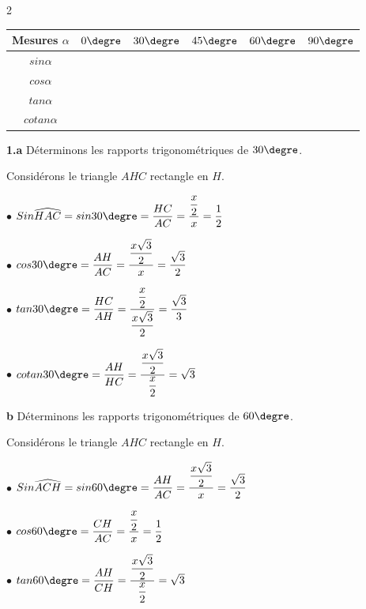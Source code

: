\begin{multicols*}{2}
\begin{enumerate}
  		\begin{tabular}{|c|c|c|c|c|c|}
  			\hline
  			Mesures $\alpha$	&$0\textrm{\degre}$  &$30\textrm{\degre}$  & $45\textrm{\degre}$ &$60\textrm{\degre}$  & $90\textrm{\degre}$ \\
  			\hline
  			$sin\alpha$	&  &  &  &  &  \\
  			\hline
  			$cos\alpha$	&  &  &  &  &  \\
  			\hline
  			$tan\alpha$	&  &  &  &  &   \\
  			\hline
  			$cotan\alpha$	&   &  &  &  &  \\
  			\hline
  		\end{tabular}
  	\end{enumerate}
  	\dure 
  	\resul
  	
  	\textbf{1.a} Déterminons les rapports trigonométriques de $30\textrm{\degre}$.
  	
  	Considérons le triangle $AHC$ rectangle en $H$.\vspace{0.3cm}
  	
  	$\bullet$ $Sin\widehat{HAC}=sin30\textrm{\degre}=\dfrac{HC}{AC}=\dfrac{\dfrac{x}{2}}{x}=\dfrac{1}{2}$\vspace{0.3cm}
  	
  	$\bullet$ $cos30\textrm{\degre}=\dfrac{AH}{AC}=\dfrac{\dfrac{x\sqrt{3}}{2}}{x}=\dfrac{\sqrt{3}}{2}$\vspace{0.3cm}
  	
  	$\bullet$ $tan30\textrm{\degre}=\dfrac{HC}{AH}=\dfrac{\dfrac{x}{2}}{\dfrac{x\sqrt{3}}{2}}=\dfrac{\sqrt{3}}{3}$ \vspace{0.3cm}
  	
  	$\bullet$ $cotan30\textrm{\degre}=\dfrac{AH}{HC}=\dfrac{\dfrac{x\sqrt{3}}{2}}{\dfrac{x}{2}}=\sqrt{3}$ \vspace{0.3cm}
  	
  	\textbf{b} Déterminons les rapports trigonométriques de $60\textrm{\degre}$.
  	
  	Considérons le triangle $AHC$ rectangle en $H$.\vspace{0.3cm}
  	
  	$\bullet$ $Sin\widehat{ACH}=sin60\textrm{\degre}=\dfrac{AH}{AC}=\dfrac{\dfrac{x\sqrt{3}}{2}}{x}=\dfrac{\sqrt{3}}{2}$\vspace{0.3cm}
  	
  	$\bullet$ $cos60\textrm{\degre}=\dfrac{CH}{AC}=\dfrac{\dfrac{x}{2}}{x}=\dfrac{1}{2}$\vspace{0.3cm}
  	
  	$\bullet$ $tan60\textrm{\degre}=\dfrac{AH}{CH}=\dfrac{\dfrac{x\sqrt{3}}{2}}{\dfrac{x}{2}}=\sqrt{3}$\vspace{0.3cm}
  	

\end{multicols*}
